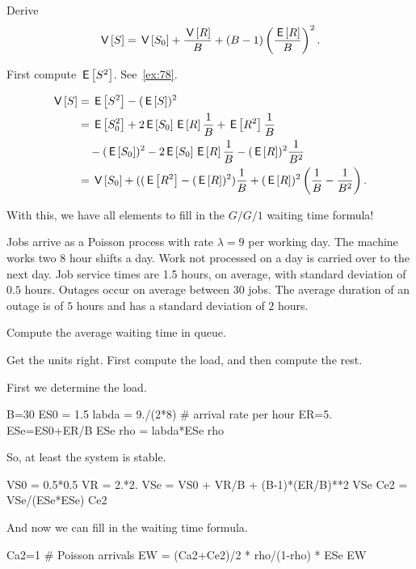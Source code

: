 \begin{exercise}
Derive 
\begin{equation}\label{eq:89} 
 \,\mathsf{V}\left[S\right] = \,\mathsf{V}\left[S_0\right] + \frac{\,\mathsf{V}\left[R\right]} B + (B-1)\left(\frac{\,\mathsf{E}\left[R\right]}{B}\right)^2.
\end{equation}
\begin{hint}
 First compute $\,\mathsf{E}\left[S^2\right]$. See~\cref{ex:78}.
\end{hint}
\begin{solution}
 \begin{equation*}
 \begin{split}
\,\mathsf{V}\left[S\right] 
&=\,\mathsf{E}\left[S^2\right] - (\,\mathsf{E}\left[S\right])^2 \\
&= \,\mathsf{E}\left[S_0^2\right] + 2 \,\mathsf{E}\left[S_0\right] \,\mathsf{E}\left[R\right]\frac 1B + \,\mathsf{E}\left[R^2\right]\frac 1B \\
&\quad - (\,\mathsf{E}\left[S_0\right])^2 - 2\,\mathsf{E}\left[S_0\right]\,\mathsf{E}\left[R\right] \frac 1 B - (\,\mathsf{E}\left[R\right])^2\frac1{B^2}\\
&= \,\mathsf{V}\left[S_0\right] + ((\,\mathsf{E}\left[R^2\right] - (\,\mathsf{E}\left[R\right])^2)\frac 1 B + (\,\mathsf{E}\left[R\right])^2\left(\frac 1B - \frac 1{B^2}\right).
 \end{split}
 \end{equation*}
\end{solution}
\end{exercise}

With this, we have all elements to fill in the $G/G/1$ waiting time formula!


\begin{exercise}
 Jobs arrive as a Poisson process with rate $\lambda=9$ per working day.
 The machine works two $8$ hour shifts a day.
 Work not processed on a day is carried over to the next day.
 Job service times are 1.5 hours, on average, with standard deviation of $0.5$ hours.
 Outages occur on average between $30$ jobs.
The average duration of an outage  is of $5$ hours and has a standard deviation of $2$ hours.

 Compute the average waiting time in queue.
\begin{hint}
 Get the units right. First compute the load, and then compute the rest.
\end{hint}
\begin{solution}
 First we determine the load. 
 \begin{pyconsole}
B=30
ES0 = 1.5
labda = 9./(2*8) # arrival rate per hour
ER=5.
ESe=ES0+ER/B
ESe
rho = labda*ESe
rho
 \end{pyconsole}
So, at least the system is stable.

\begin{pyconsole}
VS0 = 0.5*0.5
VR = 2.*2.
VSe = VS0 + VR/B + (B-1)*(ER/B)**2
VSe
Ce2 = VSe/(ESe*ESe)
Ce2
\end{pyconsole}

And now we can fill in the waiting time formula.
\begin{pyconsole}
Ca2=1 # Poisson arrivals
EW = (Ca2+Ce2)/2 * rho/(1-rho) * ESe
EW 
\end{pyconsole}
\end{solution}
\end{exercise}


